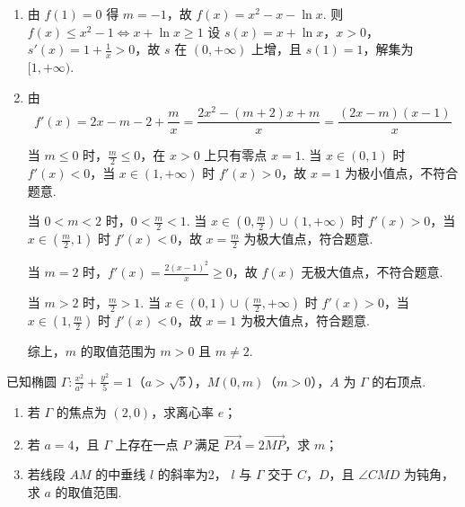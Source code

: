 \begin{solution}
\begin{enumerate}
\item 由 \(f(1)=0\) 得 \(m=-1\)，故
\(f(x)=x^2-x-\ln x\).
则
\(
f(x)\le x^2-1\iff x+\ln x\ge1
\)
设 \(s(x)=x+\ln x\)，\(x>0\)，\(s'(x)=1+\frac1x>0\)，故 \(s\) 在 \((0,+\infty)\) 上增，且 \(s(1)=1\)，解集为 \([1,+\infty)\).

\item 由
\[
f'(x)=2x-m-2+\frac{m}{x}=\frac{2x^2-(m+2)x+m}{x}=\frac{\left(2x-m\right)\left(x-1\right)}{x}
\]

当 \(m\le0\) 时，\(\frac{m}{2}\le0\)，在 \(x>0\) 上只有零点 \(x=1\). 当 \(x\in(0,1)\) 时 \(f'(x)<0\)，当 \(x\in(1,+\infty)\) 时 \(f'(x)>0\)，故 \(x=1\) 为极小值点，不符合题意.

当 \(0<m<2\) 时，\(0<\frac{m}{2}<1\). 当 \(x\in\left(0,\frac{m}{2}\right)\cup(1,+\infty)\) 时 \(f'(x)>0\)，当 \(x\in\left(\frac{m}{2},1\right)\) 时 \(f'(x)<0\)，故 \(x=\frac{m}{2}\) 为极大值点，符合题意.

当 \(m=2\) 时，\(f'(x)=\frac{2\left(x-1\right)^2}{x}\ge0\)，故 \(f(x)\) 无极大值点，不符合题意.

当 \(m>2\) 时，\(\frac{m}{2}>1\). 当 \(x\in(0,1)\cup\left(\frac{m}{2},+\infty\right)\) 时 \(f'(x)>0\)，当 \(x\in\left(1,\frac{m}{2}\right)\) 时 \(f'(x)<0\)，故 \(x=1\) 为极大值点，符合题意.

综上，\(m\) 的取值范围为 \(m>0\) 且 \(m\ne2\).
\end{enumerate}
\end{solution}

\begin{problem}
已知椭圆 \(\Gamma:\frac{x^2}{a^2}+\frac{y^2}{5}=1\)（\(a>\sqrt5\)），\(M(0,m)\)（\(m>0\)），\(A\) 为 \(\Gamma\) 的右顶点.
\begin{enumerate}
\item 若 \(\Gamma\) 的焦点为 \((2,0)\)，求离心率 \(e\)；
\item 若 \(a=4\)，且 \(\Gamma\) 上存在一点 \(P\) 满足 \(\overrightarrow{PA}=2\overrightarrow{MP}\)，求 \(m\)；
\item 若线段 \(AM\) 的中垂线 \(l\) 的斜率为2， \(l\) 与 \(\Gamma\) 交于 \(C\)，\(D\)，且 \(\angle CMD\) 为钝角，求 \(a\) 的取值范围.
\end{enumerate}
\end{problem}

